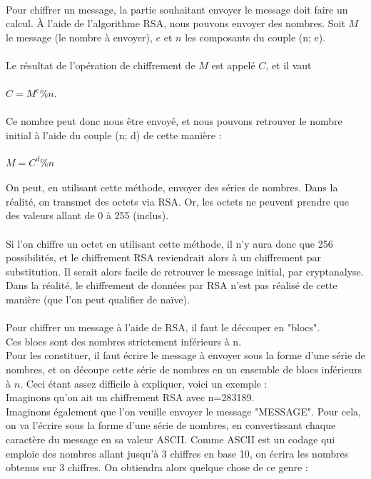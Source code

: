 		\\
		Pour chiffrer un message, la partie souhaitant envoyer le message doit faire un calcul. À l'aide de l'algorithme RSA, nous pouvons envoyer des nombres. Soit $M$ le message (le nombre à envoyer), $e$ et $n$ les composants du couple (n; e).\\
		\\
		Le résultat de l'opération de chiffrement de $M$ est appelé $C$, et il vaut\\
		\\
		$C = M^e \% n$.\\
		\\
		Ce nombre peut donc nous être envoyé, et nous pouvons retrouver le nombre initial à l'aide du couple (n; d) de cette manière :\\
		\\
		$M = C^d \% n$\\
		\\
		On peut, en utilisant cette méthode, envoyer des séries de nombres. Dans la réalité, on transmet des octets via RSA. Or, les octets ne peuvent prendre que des valeurs allant de 0 à 255 (inclus).\\
		\\
		Si l'on chiffre un octet en utilisant cette méthode, il n'y aura donc que 256 possibilités, et le chiffrement RSA reviendrait alors à un chiffrement par substitution. Il serait alors facile de retrouver le message initial, par cryptanalyse.\\
		Dans la réalité, le chiffrement de données par RSA n'est pas réalisé de cette manière (que l'on peut qualifier de naïve).\\
		\\
		Pour chiffrer un message à l'aide de RSA, il faut le découper en "blocs".\\
		Ces blocs sont des nombres strictement inférieurs à n.\\
		Pour les constituer, il faut écrire le message à envoyer sous la forme d'une série de nombres, et on découpe cette série de nombres en un ensemble de blocs inférieurs à $n$. Ceci étant assez difficile à expliquer, voici un exemple :\\
		Imaginons qu'on ait un chiffrement RSA avec n=283189.\\
		Imaginons également que l'on veuille envoyer le message "MESSAGE". Pour cela, on va l'écrire sous la forme d'une série de nombres, en convertissant chaque caractère du message en sa valeur ASCII. Comme ASCII est un codage qui emploie des nombres allant jusqu'à 3 chiffres en base 10, on écrira les nombres obtenus sur 3 chiffres. On obtiendra alors quelque chose de ce genre :\\
